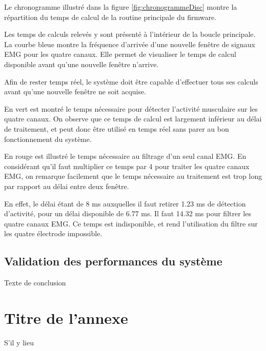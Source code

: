 \documentclass[letterpaper, twoside, 12pt, memoire, creativecommons, hyperref]{thETS}
\begin{document}
Le chronogramme illustré dans la figure \ref{fig:chronogrammeDisc} montre la répartition du temps de calcul de la routine principale du firmware. 

Les temps de calculs relevés y sont présenté à l'intérieur de la boucle principale. La courbe bleue montre la fréquence d'arrivée d'une nouvelle fenêtre de signaux EMG pour les quatre canaux. Elle permet de visualiser le temps de calcul disponible avant qu'une nouvelle fenêtre n'arrive. 

Afin de rester temps réel, le système doit être capable d'effectuer tous ses calculs avant qu'une nouvelle fenêtre ne soit acquise. 

En vert est montré le temps nécessaire pour détecter l'activité musculaire sur les quatre canaux. On observe que ce temps de calcul est largement inférieur au délai de traitement, et peut donc être utilisé en temps réel sans parer au bon fonctionnement du système.

En rouge est illustré le temps nécessaire au filtrage d'un seul canal EMG. En considérant qu'il faut multiplier ce temps par 4 pour traiter les quatre canaux EMG, on remarque facilement que le temps nécessaire au traitement est trop long par rapport au délai entre deux fenêtre. 

En effet, le délai étant de 8 ms auxquelles il faut retirer 1.23 ms de détection d'activité, pour un délai disponible de 6.77 ms. Il faut 14.32 ms pour filtrer les quatre canaux EMG. Ce temps est indisponible, et rend l'utilisation du filtre sur les quatre électrode impossible.

\section{Validation des performances du système}

\begin{conclusion}
Texte de conclusion

\end{conclusion}


\appendix


\multiannexe %
%
\chapter{Titre de l'annexe} 

S'il y lieu
\end{document}
